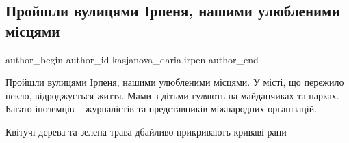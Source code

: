  
 
 
 
 
 
\subsection{Пройшли вулицями Ірпеня, нашими улюбленими місцями}
\label{sec:13_05_2022.fb.kasjanova_daria.irpen.1.ulicy_irpin}
 
\ifcmt
 author_begin
   author_id kasjanova_daria.irpen
 author_end
\fi

Пройшли вулицями Ірпеня, нашими улюбленими місцями. У місті, що пережило пекло,
відроджується життя. Мами з дітьми гуляють на майданчиках та парках. Багато
іноземців – журналістів та представників міжнародних організацій.  


Квітучі дерева та зелена трава дбайливо прикривають криваві рани




